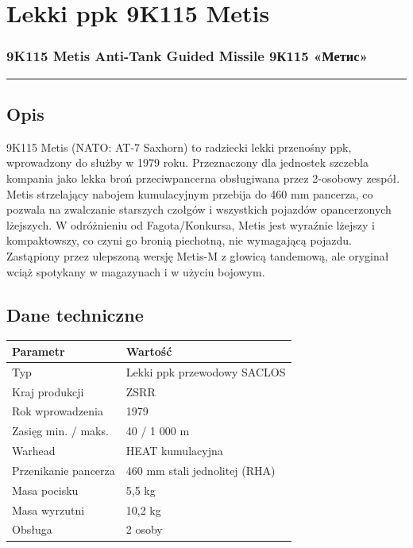 \documentclass[12pt,oneside]{book}
\begin{document}
\section{Lekki ppk 9K115 Metis}\label{lekki-ppk-9k115-metis}

\subsubsection{9K115 Metis Anti-Tank Guided Missile \textbar{} 9К115
«Метис»}\label{k115-metis-anti-tank-guided-missile-9ux43a115-ux43cux435ux442ux438ux441}

\begin{center}\rule{0.5\linewidth}{0.5pt}\end{center}

\subsection{Opis}\label{opis-51}

9K115 Metis (NATO: AT-7 Saxhorn) to radziecki lekki przenośny ppk,
wprowadzony do służby w 1979 roku. Przeznaczony dla jednostek szczebla
kompania jako lekka broń przeciwpancerna obsługiwana przez 2-osobowy
zespół. Metis strzelający nabojem kumulacyjnym przebija do 460 mm
pancerza, co pozwala na zwalczanie starszych czołgów i wszystkich
pojazdów opancerzonych lżejszych. W odróżnieniu od Fagota/Konkursa,
Metis jest wyraźnie lżejszy i kompaktowszy, co czyni go bronią
piechotną, nie wymagającą pojazdu. Zastąpiony przez ulepszoną wersję
Metis-M z głowicą tandemową, ale oryginał wciąż spotykany w magazynach i
w użyciu bojowym.

\subsection{Dane techniczne}\label{dane-techniczne-51}

\begin{longtable}[]{@{}ll@{}}
\toprule\noalign{}
Parametr & Wartość \\
\midrule\noalign{}
\endhead
\bottomrule\noalign{}
\endlastfoot
Typ & Lekki ppk przewodowy SACLOS \\
Kraj produkcji & ZSRR \\
Rok wprowadzenia & 1979 \\
Zasięg min. / maks. & 40 / 1 000 m \\
Warhead & HEAT kumulacyjna \\
Przenikanie pancerza & 460 mm stali jednolitej (RHA) \\
Masa pocisku & 5,5 kg \\
Masa wyrzutni & 10,2 kg \\
Obsługa & 2 osoby \\
\end{longtable}
\end{document}
